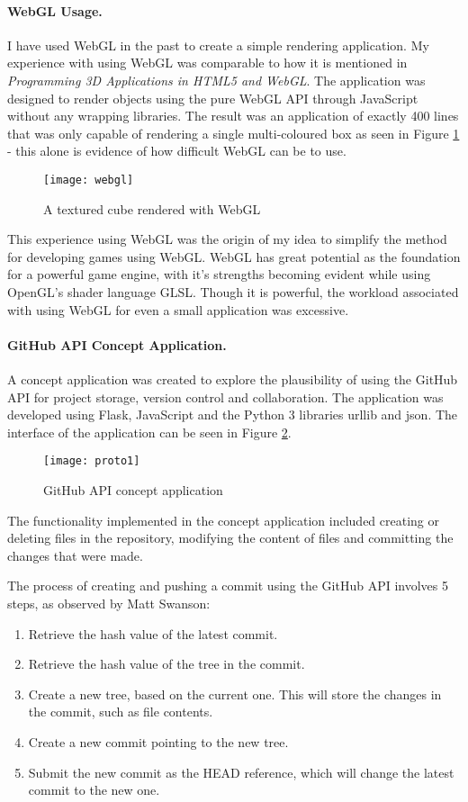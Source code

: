 \paragraph{WebGL Usage.}
I have used WebGL in the past to create a simple rendering application. My experience with using WebGL was comparable to how it is mentioned in \emph{Programming 3D Applications in HTML5 and WebGL}\cite{parisi2014programming}. The application was designed to render objects using the pure WebGL API through JavaScript without any wrapping libraries. The result was an application of exactly 400 lines that was only capable of rendering a single multi-coloured box as seen in Figure \ref{fig:webgl} - this alone is evidence of how difficult WebGL can be to use.

\begin{figure}[h]
	\centering
	\texttt{[image: webgl]}
	\caption{A textured cube rendered with WebGL}
	\label{fig:webgl}
\end{figure}

This experience using WebGL was the origin of my idea to simplify the method for developing games using WebGL. WebGL has great potential as the foundation for a powerful game engine, with it's strengths becoming evident while using OpenGL's shader language GLSL. Though it is powerful, the workload associated with using WebGL for even a small application was excessive.

\paragraph{GitHub API Concept Application.}
A concept application was created to explore the plausibility of using the GitHub API for project storage, version control and collaboration. The application was developed using Flask, JavaScript and the Python 3 libraries urllib and json. The interface of the application can be seen in Figure \ref{fig:proto1}.

\begin{figure}[h]
	\centering
	\texttt{[image: proto1]}
	\caption{GitHub API concept application}
	\label{fig:proto1}
\end{figure}

The functionality implemented in the concept application included creating or deleting files in the repository, modifying the content of files and committing the changes that were made.

The process of creating and pushing a commit using the GitHub API involves 5 steps, as observed by Matt Swanson\cite{githubapicommit}:
\begin{enumerate}
	\item Retrieve the hash value of the latest commit.
	\item Retrieve the hash value of the tree in the commit.
	\item Create a new tree, based on the current one. This will store the changes in the commit, such as file contents.
	\item Create a new commit pointing to the new tree.
	\item Submit the new commit as the HEAD reference, which will change the latest commit to the new one.
\end{enumerate}


